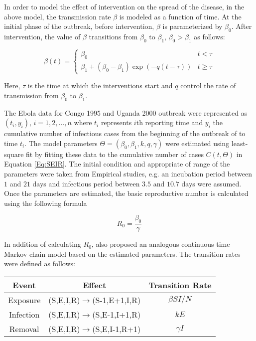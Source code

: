 \documentclass[12pt, journal,onecolumn]{IEEEtran}
\begin{document}
 In order to model the effect of intervention on the spread of the disease, in the above model, the transmission rate $\beta$ is modeled as a function of time. At the initial phase of the outbreak, before intervention, $\beta$ is parameterized by $\beta_0$. After intervention, the value of $\beta$ transitions from $\beta_0$ to $\beta_1$, $\beta_0>\beta_1$ as follows:
 
 \[
\beta(t)=\begin{cases}
\beta_{0} & t<\tau\\
\beta_{1}+(\beta_{0}-\beta_{1})\exp\left(-q\left(t-\tau\right)\right) & t\ge\tau
\end{cases}
\]

Here, $\tau$ is the time at which the interventions start and $q$ control the rate of transmission from $\beta_0$ to $\beta_1$.

The Ebola data for Congo 1995 and Uganda 2000 outbreak were represented as $(t_i,y_i)$, $i=1,2,\ldots,n$ where $t_i$ represents $i$th reporting time and $y_i$ the cumulative number of infectious cases from the beginning of the outbreak of to time $t_i$.  The model parameters $\Theta=(\beta_0,\beta_1,k,q,\gamma)$ were estimated using least-square fit by fitting these data to the cumulative number of cases $C(t,\Theta)$ in Equation \ref{Eq:SEIR}. The initial condition and appropriate of range of the parameters were taken from Empirical studies, e.g. an incubation period between $1$ and $21$ days and infectious period between $3.5$ and $10.7$ days were assumed. Once the parameters are estimated, the basic reproductive number is calculated using the following formula

\begin{equation}
R_0 = \dfrac{\beta_0}{\gamma}
\end{equation}


In addition of calculating $R_0$, \cite{chowell2004basic} also proposed an analogous continuous time Markov chain model based on the estimated parameters. The transition rates were defined as follows:

\begin{center}
\begin{tabular}{|c|c|c|}
\hline 
Event & Effect & Transition Rate\tabularnewline
\hline 
\hline 
Exposure & (S,E,I,R)$\to$(S-1,E+1,I,R) & $\beta SI/N$\tabularnewline
\hline 
Infection & (S,E,I,R)$\to$(S,E-1,I+1,R) & $kE$\tabularnewline
\hline 
Removal & (S,E,I,R)$\to$(S,E,I-1,R+1) & $\gamma I$\tabularnewline
\hline 
\end{tabular}
\end{center}
\end{document}
